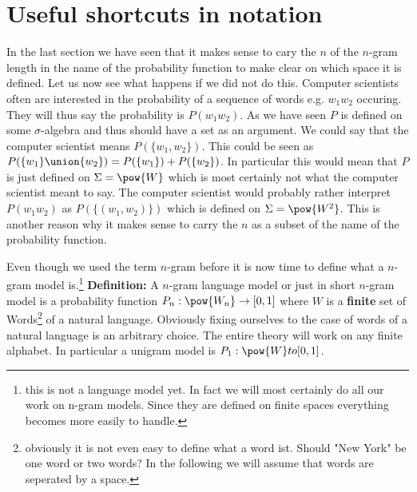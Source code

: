 \section{Useful shortcuts in notation}
In the last section we have seen that it makes sense to cary the $n$ of the $n$-gram length in the name of the probability function to make clear on which space it is defined.
Let us now see what happens if we did not do this. 
Computer scientists often are interested in the probability of a sequence of words e.g. $w_1w_2 $ occuring.
They will thus say the probability is $P(w_1w_2)$. 
As we have seen $P$ is defined on some $\sigma$-algebra and thus should have a set as an argument. 
We could say that the computer scientist means $P(\{w_1,w_2\})$. 
This could be seen as $P(\{w_1\}\union \{w_2\}) = P(\{w_1\}) + P(\{w_2\})$. 
In particular this would mean that $P$ is just defined on $\Sigma=\pow{W}$ which is most certainly not what the computer scientist meant to say.
The computer scientist would probably rather interpret $P(w_1w_2)$ as $P(\{(w_1,w_2)\})$ which is defined on $\Sigma=\pow{W^2}$.
This is another reason why it makes sense to carry the $n$ as a subset of the name of the probability function.

Even though we used the term $n$-gram before it is now time to define what a $n$-gram model is.\footnote{this is not a language model yet. In fact we will most certainly do all our work on n-gram models. Since they are defined on finite spaces everything becomes more easily to handle.}
\textbf{Definition:} A $n$-gram language model or just in short $n$-gram model is a probability function $P_n:\pow{W_n}\to [0,1]$ where $W$ is a \textbf{finite} set of Words\footnote{obviously it is not even easy to define what a word ist. Should "New York" be one word or two words? In the following we will assume that words are seperated by a space.} of a natural language. 
Obviously fixing ourselves to the case of words of a natural language is an arbitrary choice.
The entire theory will work on any finite alphabet.
In particular a unigram model is $P_1:\pow{W}to [0,1]$.

